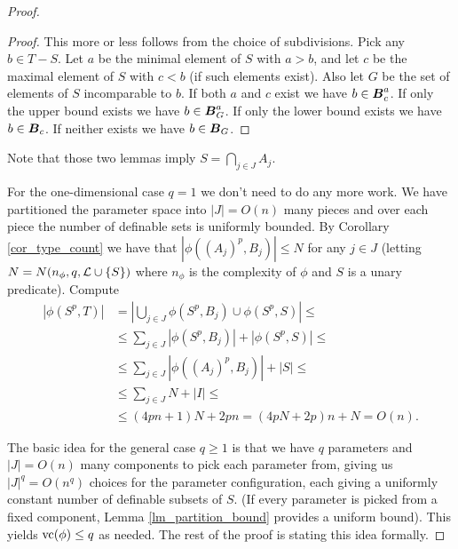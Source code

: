 \begin{proof}
  \begin{proof}
    This more or less follows from the choice of subdivisions. Pick any $b \in T - S$.
    Let $a$ be the minimal element of $S$ with $a > b$, and let $c$ be the maximal element of $S$ with $c < b$ (if such elements exist).
    Also let $G$ be the set of elements of $S$ incomparable to $b$.
    If both $a$ and $c$ exist we have $b \in \operatorname{\boldsymbol B}^a_c$. If only the upper bound exists we have $b \in \operatorname{\boldsymbol B}^a_G$. If only the lower bound exists we have $b \in \operatorname{\boldsymbol B}_c$. If neither exists we have $b \in \operatorname{\boldsymbol B}_G$.
  \end{proof}
  Note that those two lemmas imply $S = \bigcap_{j \in J} A_j$.
  
  For the one-dimensional case $q = 1$ we don't need to do any more work. We have partitioned the parameter space into $|J| = O(n)$ many pieces and over each piece the number of definable sets is uniformly bounded. By Corollary \ref{cor_type_count} we have that $|\phi((A_j)^p, B_j)| \leq N$ for any $j \in J$ (letting $N = N(n_\phi, q, \mathcal L \cup \{S\})$ where $n_\phi$ is the complexity of $\phi$ and $S$ is a unary predicate). Compute
  \begin{align*}
    |\phi(S^p, T)|
    &= \left|\bigcup_{j \in J} \phi(S^p, B_j) \cup \phi(S^p, S)\right| \leq \\
    &\leq \sum_{j \in J} |\phi(S^p, B_j)| + |\phi(S^p, S)| \leq \\
    &\leq \sum_{j \in J} |\phi((A_j)^p, B_j)| + |S| \leq \\
    &\leq \sum_{j \in J}N + |I| \leq \\
    &\leq (4pn + 1)N + 2pn = (4pN + 2p)n + N = O(n).
  \end{align*}
  
  The basic idea for the general case $q \geq 1$ is that we have $q$ parameters and $|J| = O(n)$ many components to pick each parameter from, giving us $|J|^q = O(n^q)$ choices for the parameter configuration, each giving a uniformly constant number of definable subsets of $S$. (If every parameter is picked from a fixed component, Lemma \ref{lm_partition_bound} provides a uniform bound). This yields $\operatorname{vc}(\phi) \leq q$ as needed. The rest of the proof is stating this idea formally.
  

\end{proof}
